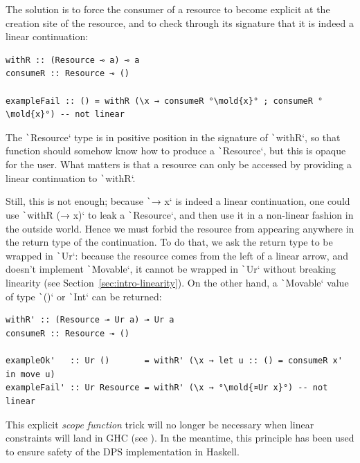 \documentclass[english]{jflart}
\newcommand{\mold}[1]{\colorbox{red!50}{#1}}
\newlength{\currentparskip}
\newenvironment{unbreakable}
{%
  \setlength{\currentparskip}{\parskip}%
  \setlength{\parskip}{\currentparskip}%
  \par\vspace{0.5\baselineskip}%
  \noindent\begin{minipage}{\textwidth}%
    \setlength{\parskip}{\currentparskip}%
}
{%
  \end{minipage}%
  \par\vspace{0.5\baselineskip}%
}
\begin{document}
The solution is to force the consumer of a resource to become explicit at the creation site of the resource, and to check through its signature that it is indeed a linear continuation:

\begin{unbreakable}
{\small
\begin{verbatim}
withR :: (Resource ⊸ a) ⊸ a
consumeR :: Resource ⊸ ()

exampleFail :: () = withR (\x → consumeR °\mold{x}° ; consumeR °\mold{x}°) -- not linear
\end{verbatim}
}
\end{unbreakable}

The \texttt`Resource` type is in positive position in the signature of \texttt`withR`, so that function should somehow know how to produce a \texttt`Resource`, but this is opaque for the user. What matters is that a resource can only be accessed by providing a linear continuation to \texttt`withR`.

Still, this is not enough; because \texttt`\x → x` is indeed a linear continuation, one could use \texttt`withR (\x → x)` to leak a \texttt`Resource`, and then use it in a non-linear fashion in the outside world. Hence we must forbid the resource from appearing anywhere in the return type of the continuation. To do that, we ask the return type to be wrapped in \texttt`Ur`: because the resource comes from the left of a linear arrow, and doesn't implement \texttt`Movable`, it cannot be wrapped in \texttt`Ur` without breaking linearity (see Section~\ref{sec:intro-linearity}). On the other hand, a \texttt`Movable` value of type \texttt`()` or \texttt`Int` can be returned:
\begin{unbreakable}
{\small
\begin{verbatim}
withR' :: (Resource ⊸ Ur a) ⊸ Ur a
consumeR :: Resource ⊸ ()

exampleOk'   :: Ur ()       = withR' (\x → let u :: () = consumeR x' in move u)
exampleFail' :: Ur Resource = withR' (\x → °\mold{¤Ur x}°) -- not linear
\end{verbatim}
}
\end{unbreakable}

This explicit \emph{scope function} trick will no longer be necessary when linear constraints will land in GHC (see \cite{spiwack_linearly_2022}). In the meantime, this principle has been used to ensure safety of the DPS implementation in Haskell.
\end{document}
